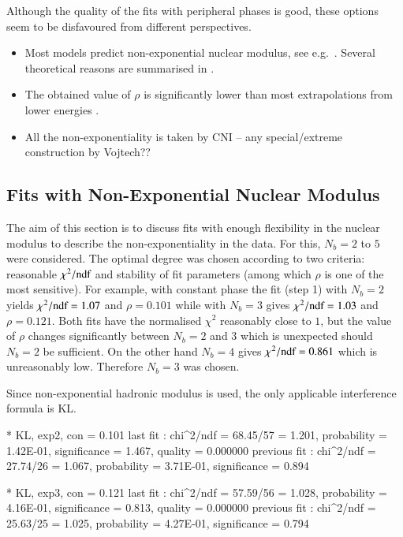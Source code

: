 Although the quality of the fits with peripheral phases is good, these options seem to be disfavoured from different perspectives.
\begin{itemize}
\item Most models predict non-exponential nuclear modulus, see e.g.~\cite{elegent}. Several theoretical reasons are summarised in \cite{kmr15-slope}.
\item The obtained value of $\rho$ is significantly lower than most extrapolations from lower energies .
\item All the non-exponentiality is taken by CNI -- any special/extreme construction by Vojtech?? 
\end{itemize}


\subsection{Fits with Non-Exponential Nuclear Modulus}
\label{sec:fit exp3}

The aim of this section is to discuss fits with enough flexibility in the nuclear modulus to describe the non-exponentiality in the data. For this, $N_b=2$ to $5$ were considered. The optimal degree was chosen according to two criteria: reasonable $\chi^2/\hbox{ndf}$ and stability of fit parameters (among which $\rho$ is one of the most sensitive). For example, with constant phase the fit (step 1) with $N_b=2$ yields $\chi^2/\hbox{ndf} = 1.07$ and $\rho = 0.101$ while with $N_b=3$ gives $\chi^2/\hbox{ndf} = 1.03$ and $\rho = 0.121$. Both fits have the normalised $\chi^2$ reasonably close to $1$, but the value of $\rho$ changes significantly between $N_b=2$ and $3$ which is unexpected should $N_b=2$ be sufficient. On the other hand $N_b=4$ gives $\chi^2/\hbox{ndf} = 0.861$ which is unreasonably low. Therefore $N_b=3$ was chosen.

Since non-exponential hadronic modulus is used, the only applicable interference formula is KL.


\iffalse
* KL, exp2, con
\rh       =   0.101 
last fit     : chi^2/ndf = 68.45/57 = 1.201, probability = 1.42E-01, significance = 1.467, quality = 0.000000
previous fit : chi^2/ndf = 27.74/26 = 1.067, probability = 3.71E-01, significance = 0.894

* KL, exp3, con
\rh       =   0.121 
last fit     : chi^2/ndf = 57.59/56 = 1.028, probability = 4.16E-01, significance = 0.813, quality = 0.000000
previous fit : chi^2/ndf = 25.63/25 = 1.025, probability = 4.27E-01, significance = 0.794

